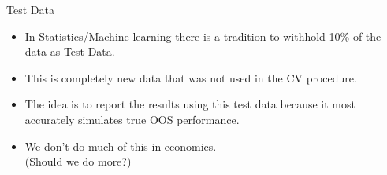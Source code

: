 \documentclass[aspectratio=169]{beamer}
\begin{document}
\begin{frame}{Test Data}
\begin{itemize}
\item In Statistics/Machine learning there is a tradition to withhold 10\% of the data as \alert{Test Data}.
\item This is \alert{completely new data} that was not used in the CV procedure.
\item The idea is to report the results using this test data because it most accurately simulates true OOS performance.
\item We don't do much of this in economics.\\
 (Should we do more?)
\end{itemize}
\end{frame}
\end{document}
